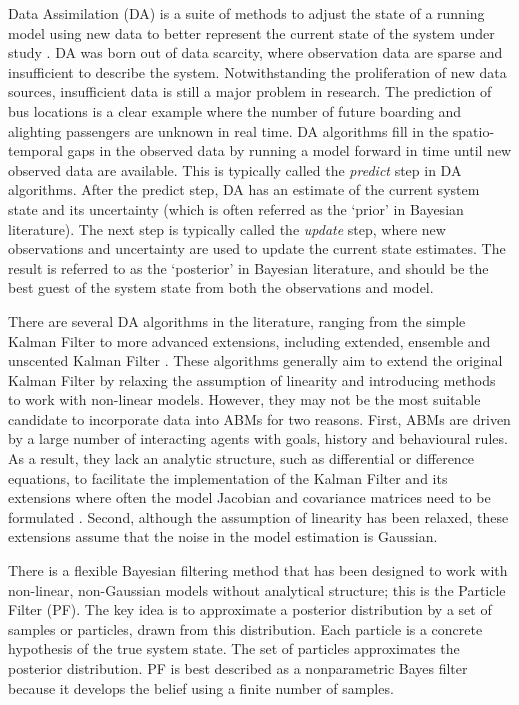 Data Assimilation (DA) is a suite of methods to adjust the state of a running model using new data to better represent the current state of the system under study \citep{ward_dynamic_2016}. DA was born out of data scarcity, where observation data are sparse and insufficient to describe the system. Notwithstanding the proliferation of new data sources, insufficient data is still a major problem in research. The prediction of bus locations is a clear example where the number of future boarding and alighting passengers are unknown in real time. DA algorithms fill in the spatio-temporal gaps in the observed data by running a model forward in time until new observed data are available. This is typically called the \textit{predict} step in DA algorithms. After the predict step, DA has an estimate of the current system state and its uncertainty (which is often referred as the `prior' in Bayesian literature). The next step is typically called the \textit{update} step, where new observations and uncertainty are used to update the current state estimates. The result is referred to as the `posterior' in Bayesian literature, and should be the best guest of the system state from both the observations and model.

There are several DA algorithms in the literature, ranging from the simple Kalman Filter \citep{meinhold1983understanding} to more advanced extensions, including extended, ensemble and unscented Kalman Filter \citep{ward_dynamic_2016}. These algorithms generally aim to extend the original Kalman Filter by relaxing the assumption of linearity and introducing methods to work with non-linear models. However, they may not be the most suitable candidate to incorporate data into ABMs for two reasons. First, ABMs are driven by a large number of interacting agents with goals, history and behavioural rules. As a result, they lack an analytic structure, such as differential or difference equations, to facilitate the implementation of the Kalman Filter and its extensions where often the model Jacobian and covariance matrices need to be formulated \citep{wang_data_2015}. Second, although the assumption of linearity has been relaxed, these extensions assume that the noise in the model estimation is Gaussian. 

There is a flexible Bayesian filtering method that has been designed to work with non-linear, non-Gaussian models without analytical structure; this is the Particle Filter (PF). The key idea is to approximate a posterior distribution by a set of samples or particles, drawn from this distribution. Each particle is a concrete hypothesis of the true system state. The set of particles approximates the posterior distribution. PF is best described as a nonparametric Bayes filter because it develops the belief using a finite number of samples. 

